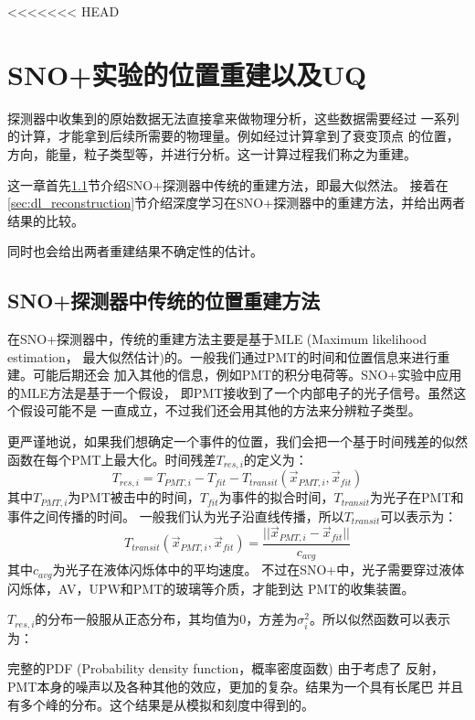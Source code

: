 <<<<<<< HEAD
\chapter{SNO+实验的位置重建以及UQ}

探测器中收集到的原始数据无法直接拿来做物理分析，这些数据需要经过
一系列的计算，才能拿到后续所需要的物理量。例如经过计算拿到了衰变顶点
的位置，方向，能量，粒子类型等，并进行分析。这一计算过程我们称之为重建。

这一章首先\ref{sec:classical_reconstruction}节介绍SNO+探测器中传统的重建方法，即最大似然法。
接着在\ref{sec:dl_reconstruction}节介绍深度学习在SNO+探测器中的重建方法，并给出两者结果的比较。

同时也会给出两者重建结果不确定性的估计。

\section{SNO+探测器中传统的位置重建方法}\label{sec:classical_reconstruction}

在SNO+探测器中，传统的重建方法主要是基于MLE (Maximum likelihood estimation，
最大似然估计)的。一般我们通过PMT的时间和位置信息来进行重建。可能后期还会
加入其他的信息，例如PMT的积分电荷等。SNO+实验中应用的MLE方法是基于一个假设，
即PMT接收到了一个内部电子的光子信号。\cite{anderson2024}虽然这个假设可能不是
一直成立，不过我们还会用其他的方法来分辨粒子类型。

更严谨地说，如果我们想确定一个事件的位置，我们会把一个基于时间残差的似然
函数在每个PMT上最大化。时间残差$T_{res,i}$的定义为：
\begin{equation}
T_{res,i} = T_{PMT,i}-T_{fit}-T_{transit}(\vec{x}_{PMT,i},\vec{x}_{fit})
\label{eq:residual}
\end{equation}
其中$T_{PMT,i}$为PMT被击中的时间，$T_{fit}$为事件的拟合时间，$T_{transit}$为光子在PMT和事件之间传播的时间。
一般我们认为光子沿直线传播，所以$T_{transit}$可以表示为：
\begin{equation}
T_{transit}(\vec{x}_{PMT,i},\vec{x}_{fit}) = \frac{||\vec{x}_{PMT,i}-\vec{x}_{fit}||}{c_{avg}}
\end{equation}
其中$c_{avg}$为光子在液体闪烁体中的平均速度。
不过在SNO+中，光子需要穿过液体闪烁体，AV，UPW和PMT的玻璃等介质，才能到达
PMT的收集装置。

$T_{res,i}$的分布一般服从正态分布，其均值为0，方差为$\sigma_{i}^2$。所以似然函数可以表示为：

完整的PDF (Probability density function，概率密度函数) 由于考虑了
反射，PMT本身的噪声以及各种其他的效应，更加的复杂。结果为一个具有长尾巴
并且有多个峰的分布。这个结果是从模拟和刻度中得到的。\cite{anderson2024}

